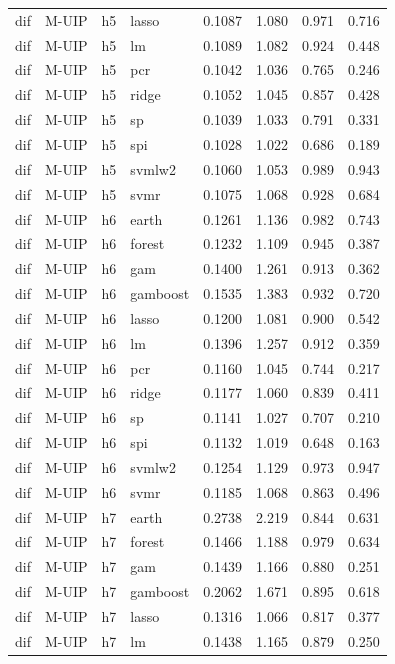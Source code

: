 \begin{ThreePartTable}
\begin{longtable}[t]{llclcccc}
dif & M-UIP & h5 & lasso & 0.1087 & 1.080 & 0.971 & 0.716\\
dif & M-UIP & h5 & lm & 0.1089 & 1.082 & 0.924 & 0.448\\
dif & M-UIP & h5 & pcr & 0.1042 & 1.036 & 0.765 & 0.246\\
dif & M-UIP & h5 & ridge & 0.1052 & 1.045 & 0.857 & 0.428\\
dif & M-UIP & h5 & sp & 0.1039 & 1.033 & 0.791 & 0.331\\
dif & M-UIP & h5 & spi & 0.1028 & 1.022 & 0.686 & 0.189\\
dif & M-UIP & h5 & svmlw2 & 0.1060 & 1.053 & 0.989 & 0.943\\
dif & M-UIP & h5 & svmr & 0.1075 & 1.068 & 0.928 & 0.684\\
\addlinespace
dif & M-UIP & h6 & earth & 0.1261 & 1.136 & 0.982 & 0.743\\
dif & M-UIP & h6 & forest & 0.1232 & 1.109 & 0.945 & 0.387\\
dif & M-UIP & h6 & gam & 0.1400 & 1.261 & 0.913 & 0.362\\
dif & M-UIP & h6 & gamboost & 0.1535 & 1.383 & 0.932 & 0.720\\
dif & M-UIP & h6 & lasso & 0.1200 & 1.081 & 0.900 & 0.542\\
dif & M-UIP & h6 & lm & 0.1396 & 1.257 & 0.912 & 0.359\\
dif & M-UIP & h6 & pcr & 0.1160 & 1.045 & 0.744 & 0.217\\
dif & M-UIP & h6 & ridge & 0.1177 & 1.060 & 0.839 & 0.411\\
dif & M-UIP & h6 & sp & 0.1141 & 1.027 & 0.707 & 0.210\\
dif & M-UIP & h6 & spi & 0.1132 & 1.019 & 0.648 & 0.163\\
dif & M-UIP & h6 & svmlw2 & 0.1254 & 1.129 & 0.973 & 0.947\\
dif & M-UIP & h6 & svmr & 0.1185 & 1.068 & 0.863 & 0.496\\
\addlinespace
dif & M-UIP & h7 & earth & 0.2738 & 2.219 & 0.844 & 0.631\\
dif & M-UIP & h7 & forest & 0.1466 & 1.188 & 0.979 & 0.634\\
dif & M-UIP & h7 & gam & 0.1439 & 1.166 & 0.880 & 0.251\\
dif & M-UIP & h7 & gamboost & 0.2062 & 1.671 & 0.895 & 0.618\\
dif & M-UIP & h7 & lasso & 0.1316 & 1.066 & 0.817 & 0.377\\
dif & M-UIP & h7 & lm & 0.1438 & 1.165 & 0.879 & 0.250\\

\end{longtable}
\end{ThreePartTable}
